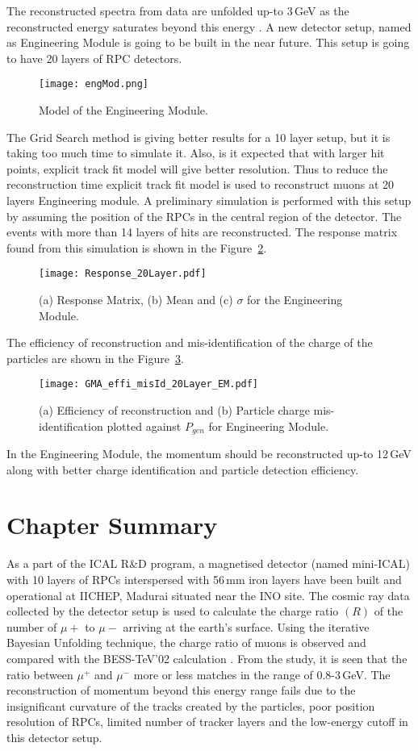 The reconstructed spectra from data are unfolded up-to 3\,GeV as the
reconstructed energy saturates beyond this energy \cite{daeratio,ratio1}.
A new detector setup, named as Engineering Module is going to be
built in the near future. This setup is going to have 20 layers of RPC
detectors.
\begin{figure}[h]
  \centering
  \texttt{[image: engMod.png]}
  \caption{Model of the Engineering Module.}
  \label{fig:eng_mod}
\end{figure}
The Grid Search method is giving better results for a 10 layer setup, but it is taking too
much time to simulate it. Also, is it expected that with larger hit points, explicit
track fit model will give better resolution. Thus to reduce the reconstruction time
explicit track fit model is used to reconstruct muons at 20 layers Engineering module.
A preliminary simulation is performed with this setup by assuming the
position of the RPCs in the central region of the detector. The events
with more than 14 layers of hits are reconstructed.
The response matrix found from this simulation is shown in the
Figure~\ref{fig:eng_mod}.
\begin{figure}[h]
  \centering
  \texttt{[image: Response\_20Layer.pdf]}
  \caption{(a) Response Matrix, (b) Mean and (c) $\sigma$ for
    the Engineering Module.}
  \label{fig:eng_mod}
\end{figure}
The efficiency of reconstruction and mis-identification of the charge
of the particles are shown in the Figure~\ref{fig:eng_mod_effi}.
\begin{figure}[h]
  \centering
  \texttt{[image: GMA\_effi\_misId\_20Layer\_EM.pdf]}
  \caption{(a) Efficiency of reconstruction and (b) Particle charge
    mis-identification plotted against $P_{gen}$ for Engineering Module.}
  \label{fig:eng_mod_effi}
\end{figure}
In the Engineering Module, the momentum should be reconstructed
up-to 12\,GeV along with better charge identification and particle
detection efficiency.

\section{Chapter Summary}
As a part of the ICAL R\&D program, a magnetised detector
(named mini-ICAL) with 10 layers of RPCs interspersed with 56\,mm iron
layers have been built and operational at IICHEP, Madurai situated
near the INO site. The cosmic ray data collected by the detector
setup is used to calculate the charge ratio $(R)$ of the number
of $\mu+$ to $\mu-$ arriving at the earth's surface.
Using the iterative Bayesian Unfolding technique, the charge ratio
of muons is observed and compared with the BESS-TeV'02 calculation
\cite{bess2002}.
From the study, it is seen that the ratio between $\mu^{+}$ and
$\mu^{-}$ more or less matches in the range of 0.8-3\,GeV.
The reconstruction of momentum beyond this energy range fails due to the
insignificant curvature of the tracks created by the particles, poor
position resolution of RPCs, limited number of tracker layers and
the low-energy cutoff in this detector setup.

